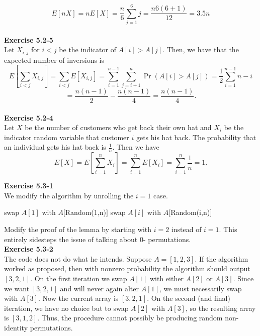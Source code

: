 \documentclass{article}
\begin{document}
\[
E[nX] = nE[X] = \frac{n}{6} \sum_{j=1}^6 j = \frac{n 6(6+1)}{12} = 3.5 n
\]\\


\noindent\textbf{Exercise 5.2-5}\\

Let $X_{i,j}$ for $i<j$ be the indicator of $A[i] > A[j]$. Then, we have that the expected number of inversions is
\[
E\left[\sum_{i<j} X_{i,j}\right] = \sum_{i<j} E[X_{i,j}] = \sum_{i=1}^{n-1} \sum_{j=i+1}^n \Pr(A[i] > A[j]) = \frac{1}{2} \sum_{i=1}^{n-1} n-i \]\[= \frac{n(n-1)}{2} - \frac{n(n-1)}{4} = \frac{n(n-1)}{4} . 
\]\\

\noindent\textbf{Exercise 5.2-4}\\

Let $X$ be the number of customers who get back their own hat and $X_i$ be the indicator random variable that customer $i$ gets his hat back.  The probability that an individual gets his hat back is $\frac{1}{n}$.  Then we have
\[ E[X] = E\left[ \sum_{i=1}^n X_i \right] = \sum_{i=1}^n E[X_i] = \sum_{i=1}^n \frac{1}{n} = 1.\]

\noindent\textbf{Exercise 5.3-1}\\

We modify the algorithm by unrolling the $i=1$ case.
\begin{algorithm}
\begin{algorithmic}[1]
\State swap $A[1]$ with $A[$Random(1,n)$]$
\State swap $A[i]$ with $A[$Random(i,n)$]$
\EndFor
\end{algorithmic}
\end{algorithm}


Modify the proof of the lemma by starting with $i=2$ instead of $i=1$. This entirely sidesteps the issue of talking about $0$- permutations.\\

\noindent\textbf{Exercise 5.3-2}\\

The code does not do what he intends.  Suppose $A = [1,2,3]$.  If the algorithm worked as proposed, then with nonzero probability the algorithm should output $[3,2,1]$.  On the first iteration we swap $A[1]$ with either $A[2]$ or $A[3]$.  Since we want $[3,2,1]$ and will never again alter $A[1]$, we must necessarily swap with $A[3]$.  Now the current array is $[3,2,1]$.  On the second (and final) iteration, we have no choice but to swap $A[2]$ with $A[3]$, so the resulting array is $[3,1,2]$.  Thus, the procedure cannot possibly be producing random non-identity permutations. \\
\end{document}
